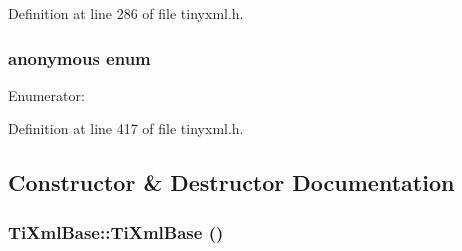 Definition at line 286 of file tinyxml.h.\hypertarget{class_ti_xml_base_a99a2fe4c7ab51f1be33d349c5fd382e8}{
\subsubsection[{"@9}]{\setlength{\rightskip}{0pt plus 5cm}anonymous enum}}
\label{class_ti_xml_base_a99a2fe4c7ab51f1be33d349c5fd382e8}
\begin{Desc}
\item[Enumerator: ]\par
\begin{description}
\item[{\em 
\hypertarget{class_ti_xml_base_a99a2fe4c7ab51f1be33d349c5fd382e8ab848893c6d03fcd8f42941d7079ccb47}{
NUM\_\-ENTITY}
\label{class_ti_xml_base_a99a2fe4c7ab51f1be33d349c5fd382e8ab848893c6d03fcd8f42941d7079ccb47}
}]\item[{\em 
\hypertarget{class_ti_xml_base_a99a2fe4c7ab51f1be33d349c5fd382e8aeb571e41586d47e28f60445cb9b41d49}{
MAX\_\-ENTITY\_\-LENGTH}
\label{class_ti_xml_base_a99a2fe4c7ab51f1be33d349c5fd382e8aeb571e41586d47e28f60445cb9b41d49}
}]\end{description}
\end{Desc}



Definition at line 417 of file tinyxml.h.

\subsection{Constructor \& Destructor Documentation}
\hypertarget{class_ti_xml_base_ac6753fe8a2c89669038fcf281cb301bf}{
\subsubsection[{TiXmlBase}]{\setlength{\rightskip}{0pt plus 5cm}TiXmlBase::TiXmlBase ()}}
\label{class_ti_xml_base_ac6753fe8a2c89669038fcf281cb301bf}


